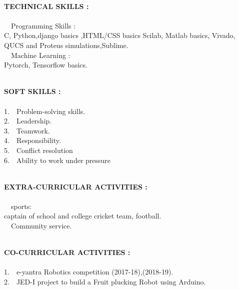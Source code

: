 \documentclass[1pt]{article}
\begin{document}
\begin{flushleft}
		\hspace{1cm}\\ \hspace{1cm}
		
		{\small \textbf{TECHNICAL SKILLS :}}\\ \ \\
		\textbullet \ \  Programming Skills :  \\ \hspace{1.4cm}C, Python,django basics ,HTML/CSS basics Scilab, Matlab basics, Vivado, QUCS and Proteus simulations,Sublime.\\
		
		\textbullet \ \ Machine Learning :  \\ \hspace{1.4cm}Pytorch, Tensorflow basics.\\
		
		
		\hspace{1cm}\\ \hspace{1cm}
		
		
		{\small \textbf{SOFT SKILLS :}}\\ \ \\
		1.\ \ Problem-solving skills.\\
		2.\ \  Leadership.\\	
		3.\ \ Teamwork.\\
		4.\ \ Responsibility.\\
		5.\ \ Conflict resolution\\
		6.\ \ Ability to work under pressure\\
		
			\hspace{1cm}\\ \hspace{1cm}
		
		
		{\small \textbf{EXTRA-CURRICULAR ACTIVITIES :}}\\ \ \\
		\textbullet \ \ sports:\\ \hspace{1cm}captain of school and college cricket team, football.\\
		\textbullet \ \ Community service.\\
		
		
		\hspace{1cm}\\ \hspace{1cm}
		
		
		{\small \textbf{CO-CURRICULAR ACTIVITIES :}}\\ \ \\
		1.\ \ e-yantra Robotics competition (2017-18),(2018-19).\\	
		2.\ \ JED-I project to build a Fruit plucking Robot using Arduino.\\
		

\end{flushleft}
\end{document}

